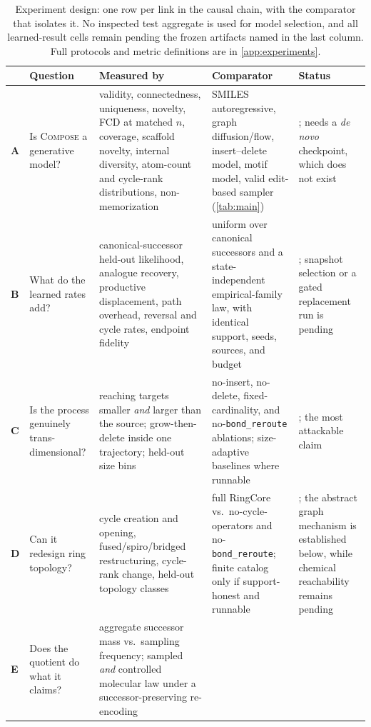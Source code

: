 \documentclass{article}
\newcommand{\method}{\textsc{Compose}\xspace}
\newcommand{\op}[1]{\texttt{#1}}
\theoremstyle{definition}
\theoremstyle{remark}
\begin{document}
\begin{table}[!t]
\centering
\caption{Experiment design: one row per link in the causal chain, with the comparator that isolates it. No inspected test aggregate is used for model selection, and all learned-result cells remain \XXX{} pending the frozen artifacts named in the last column. Full protocols and metric definitions are in \cref{app:experiments}.}
\label{tab:expdesign}
\footnotesize
\begin{tabularx}{\textwidth}{@{}l>{\raggedright\arraybackslash}p{2.45cm}YY>{\raggedright\arraybackslash}p{2.6cm}@{}}
\toprule
& Question & Measured by & Comparator & Status\\
\midrule
\textbf{A} & Is \method a generative model? &
validity, connectedness, uniqueness, novelty, FCD at matched $n$, coverage, scaffold novelty, internal diversity, atom-count and cycle-rank distributions, non-memorization &
SMILES autoregressive, graph diffusion/flow, insert--delete model, motif model, valid edit-based sampler (\cref{tab:main}) &
\XXX{}; needs a \emph{de novo} checkpoint, which does not exist\\
\addlinespace
\textbf{B} & What do the learned rates add? &
canonical-successor held-out likelihood, analogue recovery, productive displacement, path overhead, reversal and cycle rates, endpoint fidelity &
uniform over canonical successors and a state-independent empirical-family law, with identical support, seeds, sources, and budget &
\XXX{}; snapshot selection or a gated replacement run is pending\\
\addlinespace
\textbf{C} & Is the process genuinely trans-dimensional? &
reaching targets smaller \emph{and} larger than the source; grow-then-delete inside one trajectory; held-out size bins &
no-insert, no-delete, fixed-cardinality, and no-\op{bond\_reroute} ablations; size-adaptive baselines where runnable &
\XXX{}; the most attackable claim\\
\addlinespace
\textbf{D} & Can it redesign ring topology? &
cycle creation and opening, fused/spiro/bridged restructuring, cycle-rank change, held-out topology classes &
full RingCore vs.\ no-cycle-operators and no-\op{bond\_reroute}; finite catalog only if support-honest and runnable &
\XXX{}; the abstract graph mechanism is established below, while chemical reachability remains pending\\
\addlinespace
\textbf{E} & Does the quotient do what it claims? &
aggregate successor mass vs.\ sampling frequency; sampled \emph{and} controlled molecular law under a successor-preserving re-encoding &

\end{tabularx}
\end{table}
\end{document}
